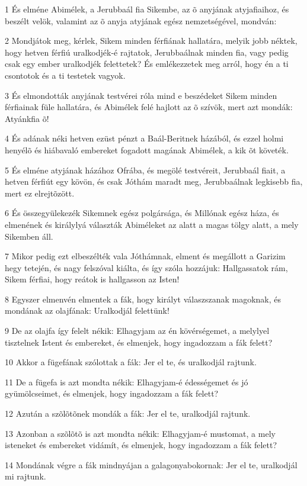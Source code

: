\par 1 És elméne Abimélek, a Jerubbaál fia Sikembe, az õ anyjának atyjafiaihoz, és beszélt velök, valamint az õ anyja atyjának egész nemzetségével, mondván:
\par 2 Mondjátok meg, kérlek, Sikem minden férfiának hallatára, melyik jobb néktek, hogy hetven férfiú uralkodjék-é rajtatok, Jerubbaálnak minden fia, vagy pedig csak egy ember uralkodjék felettetek? És emlékezzetek meg arról, hogy én a ti csontotok és a ti testetek vagyok.
\par 3 És elmondották anyjának testvérei róla mind e beszédeket Sikem minden férfiainak füle hallatára, és Abimélek felé hajlott az õ szívök, mert azt mondák: Atyánkfia õ!
\par 4 És adának néki hetven ezüst pénzt a Baál-Beritnek házából, és ezzel holmi henyélõ és hiábavaló embereket fogadott magának Abimélek, a kik õt követék.
\par 5 És elméne atyjának házához Ofrába, és megölé testvéreit, Jerubbaál fiait, a hetven férfiút egy kövön, és csak Jóthám maradt meg, Jerubbaálnak legkisebb fia, mert ez elrejtõzött.
\par 6 És összegyülekezék Sikemnek egész polgársága, és Millónak egész háza, és elmenének és királylyá választák Abiméleket az alatt a magas tölgy alatt, a mely Sikemben áll.
\par 7 Mikor pedig ezt elbeszélték vala Jóthámnak, elment és megállott a Garizim hegy tetején, és nagy felszóval kiálta, és így szóla hozzájuk: Hallgassatok rám, Sikem férfiai, hogy reátok is hallgasson az Isten!
\par 8 Egyszer elmenvén elmentek a fák, hogy királyt válaszszanak magoknak, és mondának az olajfának: Uralkodjál felettünk!
\par 9 De az olajfa így felelt nékik: Elhagyjam az én kövérségemet, a melylyel tisztelnek Istent és embereket, és elmenjek, hogy ingadozzam a fák felett?
\par 10 Akkor a fügefának szólottak a fák: Jer el te, és uralkodjál rajtunk.
\par 11 De a fügefa is azt mondta nékik: Elhagyjam-é édességemet és jó gyümölcseimet, és elmenjek, hogy ingadozzam a fák felett?
\par 12 Azután a szõlõtõnek mondák a fák: Jer el te, uralkodjál rajtunk.
\par 13 Azonban a szõlõtõ is azt mondta nékik: Elhagyjam-é mustomat, a mely isteneket és embereket vidámít, és elmenjek, hogy ingadozzam a fák felett?
\par 14 Mondának végre a fák mindnyájan a galagonyabokornak: Jer el te, uralkodjál mi rajtunk.
